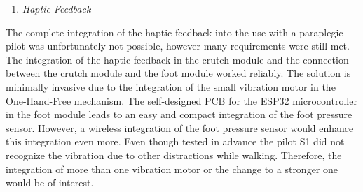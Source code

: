\documentclass[conference,a4paper]{IEEEtran}
\begin{document}
\begin{enumerate}
\item{\textit{Haptic Feedback}}
\end{enumerate}

The complete integration of the haptic feedback into the use with a paraplegic pilot was unfortunately not possible, however many requirements were still met. The integration of the haptic feedback in the crutch module and the connection between the crutch module and the foot module worked reliably. The solution is minimally invasive due to the integration of the small vibration motor in the One-Hand-Free mechanism. The self-designed PCB for the ESP32 microcontroller in the foot module leads to an easy and compact integration of the foot pressure sensor. However, a wireless integration of the foot pressure sensor would enhance this integration even more. Even though tested in advance the pilot S1 did not recognize the vibration due to other distractions while walking. Therefore, the integration of more than one vibration motor or the change to a stronger one would be of interest. \\
\end{document}

